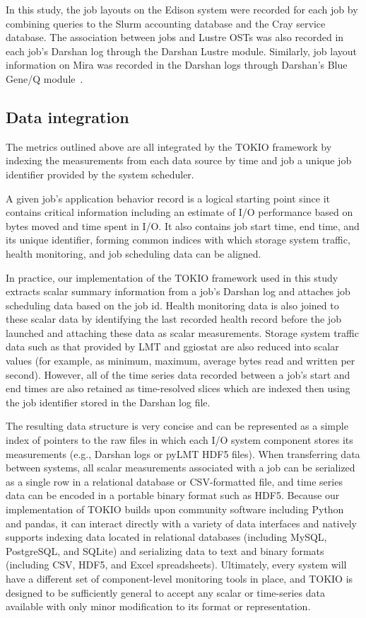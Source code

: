 In this study, the job layouts on the Edison system were recorded for each job by combining queries to the Slurm accounting database and the Cray service database.
The association between jobs and Lustre OSTs was also recorded in each job's Darshan log through the Darshan Lustre module.
Similarly, job layout information on Mira was recorded in the Darshan logs through Darshan's Blue Gene/Q module~\cite{snyder2016modular}.

\subsection{Data integration} \label{sec:data-integration}

The metrics outlined above are all integrated by the TOKIO framework by indexing the measurements from each data source by time and job a unique job identifier provided by the system scheduler.

A given job's application behavior record is a logical starting point since it contains critical information including an estimate of I/O performance based on bytes moved and time spent in I/O.  It also contains job start time, end time, and its unique identifier, forming common indices with which storage system traffic, health monitoring, and job scheduling data can be aligned.

In practice, our implementation of the TOKIO framework used in this study  extracts scalar summary information from a job's Darshan log and attaches job scheduling data based on the job id.
Health monitoring data is also joined to these scalar data by identifying the last recorded health record before the job launched and attaching these data as scalar measurements.
Storage system traffic data such as that provided by LMT and ggiostat are also reduced into scalar values (for example, as minimum, maximum, average bytes read and written per second).
However, all of the time series data recorded between a job's start and end times are also retained as time-resolved slices which are indexed then using the job identifier stored in the Darshan log file.

The resulting data structure is very concise and can be represented as a simple index of pointers to the raw files in which each I/O system component stores its measurements (e.g., Darshan logs or pyLMT HDF5 files).
When transferring data between systems, all scalar measurements associated with a job can be serialized as a single row in a relational database or CSV-formatted file, and time series data can be encoded in a portable binary format such as HDF5.
Because our implementation of TOKIO builds upon community software including Python and pandas, it can interact directly with a variety of data interfaces and
natively supports indexing data located in relational databases (including MySQL, PostgreSQL, and SQLite) and serializing data to text and binary formats (including CSV, HDF5, and Excel spreadsheets).  Ultimately, every system will have a different set of component-level monitoring tools in place, and TOKIO is designed to be sufficiently general to accept any scalar or time-series data available with only minor modification to its format or representation.

